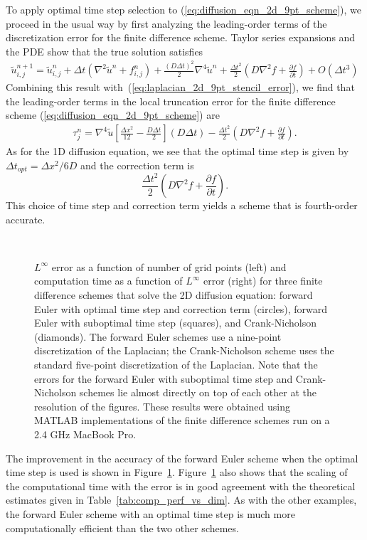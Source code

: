 \documentclass[fleqn,12pt,twoside]{article}
\newcommand{\beq}{\begin{equation}}
\newcommand{\eeq}{\end{equation}}
\newcommand{\bea}{\begin{eqnarray}}
\newcommand{\eea}{\end{eqnarray}}
\def\pt{\partial t}
\def\tu{\tilde{u}}
\def\dt{\Delta t}
\def\dx{\Delta x}
\def\dto{\dt_{opt}}
\begin{document}
To apply optimal time step selection to (\ref{eq:diffusion_eqn_2d_9pt_scheme}), we proceed in the usual way by first analyzing the leading-order terms of the 
discretization error for the finite difference scheme.  Taylor series 
expansions and the PDE show that the true solution satisfies 
\bea
  \tu^{n+1}_{i,j} = \tu^{n}_{i,j}
  + \dt \left(\nabla^2 \tu^{n} +f^n_{i,j} \right)
  + \frac{(D \dt)^2}{2} \nabla^4 \tu^{n}
  + \frac{\dt^2}{2} \left( D\nabla^2 f + \frac{\partial f}{\pt} \right)
  + O \left( \dt^3 \right)
  \label{eq:diffusion_eqn_2d_time_err} 
\eea
Combining this result with~(\ref{eq:laplacian_2d_9pt_stencil_error}), 
we find that the leading-order terms in the 
local truncation error for the finite difference 
scheme (\ref{eq:diffusion_eqn_2d_9pt_scheme}) are
\bea
  \tau^{n}_j = 
  \nabla^4 \tu
      \left[ \frac{\dx^2}{12} - \frac{D \dt}{2}  \right] (D \dt)
  - \frac{\dt^2}{2} \left( D\nabla^2 f + \frac{\partial f}{\pt} \right).
  \label{eq:diffusion_eqn_2d_trunc_err}
\eea
As for the 1D diffusion equation, we see that the optimal time step is given 
by $\dto = \dx^2/6D$ and the correction term is 
\beq
  \frac{\dt^2}{2} \left( D\nabla^2 f + \frac{\partial f}{\pt} \right).
\eeq
This choice of time step and correction term yields a scheme that is 
fourth-order accurate.  

\begin{figure}[tb]
\begin{center}
\ \ 
\caption{$L^\infty$ error as a function of number of grid points (left)
and computation time as a function of $L^\infty$ error (right) for three
finite difference schemes that solve the 2D diffusion equation:
forward Euler with optimal time step and correction term (circles), forward 
Euler with suboptimal time step (squares), and Crank-Nicholson (diamonds).  
The forward Euler schemes use a nine-point discretization of the Laplacian;
the Crank-Nicholson scheme uses the standard five-point discretization of
the Laplacian.  
Note that the errors for the forward Euler with suboptimal time step and 
Crank-Nicholson schemes lie almost directly on top of each other at the 
resolution of the figures.  
These results were obtained using MATLAB implementations of the 
finite difference schemes run on a 2.4 GHz MacBook Pro.
}
\label{fig:diffusion_eqn_2d_src_analysis}
\end{center}
\end{figure}
The improvement in the accuracy of the forward Euler scheme when the optimal 
time step is used is shown in Figure~\ref{fig:diffusion_eqn_2d_src_analysis}.
Figure~\ref{fig:diffusion_eqn_2d_src_analysis} also shows that the 
scaling of the computational time with the error is in good agreement with the
theoretical estimates given in Table~\ref{tab:comp_perf_vs_dim}.  As with the
other examples, the forward Euler scheme with an optimal time step is much 
more computationally efficient than the two other schemes.  
\end{document}
